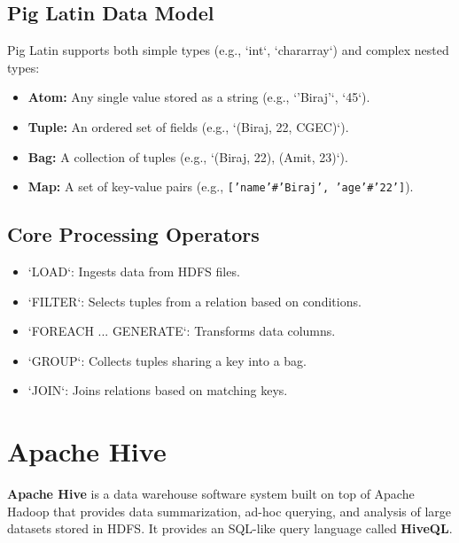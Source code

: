 \documentclass[12pt,a4paper]{article}
\begin{document}
\subsection{Pig Latin Data Model}
Pig Latin supports both simple types (e.g., `int`, `chararray`) and complex nested types:
\begin{itemize}[leftmargin=*, itemsep=3pt]
  \item \textbf{Atom:} Any single value stored as a string (e.g., `'Biraj'`, `45`).
  \item \textbf{Tuple:} An ordered set of fields (e.g., `(Biraj, 22, CGEC)`).
  \item \textbf{Bag:} A collection of tuples (e.g., `{(Biraj, 22), (Amit, 23)}`).
  \item \textbf{Map:} A set of key-value pairs (e.g., \texttt{['name'\#'Biraj', 'age'\#'22']}).
\end{itemize}

\subsection{Core Processing Operators}
\begin{itemize}[leftmargin=*, itemsep=3pt]
  \item `LOAD`: Ingests data from HDFS files.
  \item `FILTER`: Selects tuples from a relation based on conditions.
  \item `FOREACH ... GENERATE`: Transforms data columns.
  \item `GROUP`: Collects tuples sharing a key into a bag.
  \item `JOIN`: Joins relations based on matching keys.
\end{itemize}

\section{Apache Hive}

\begin{tcolorbox}[defbox, title={Apache Hive}]
  \textbf{Apache Hive} is a data warehouse software system built on top of Apache Hadoop that provides data summarization, ad-hoc querying, and analysis of large datasets stored in HDFS. It provides an SQL-like query language called \textbf{HiveQL}.
\end{tcolorbox}
\end{document}
